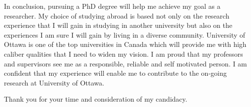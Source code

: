 \documentclass[10pt]{article}%
\begin{document}
 
 
  	In conclusion, pursuing a PhD degree will help me achieve my goal as a researcher. My choice of studying abroad is based not only on the research experience that I will gain in  studying in another university but also on the experiences I am sure I will gain by living in a diverse community.  University of Ottawa is one of the top universities in Canada which will provide me with high caliber qualities that I need to widen my vision. I am proud that my professors and supervisors see me as a responsible, reliable and self motivated person. I am confident that my experience will enable me to contribute to the on-going research at University of Ottawa.


\noindent Thank you for your time and consideration of my candidacy.
\end{document}
